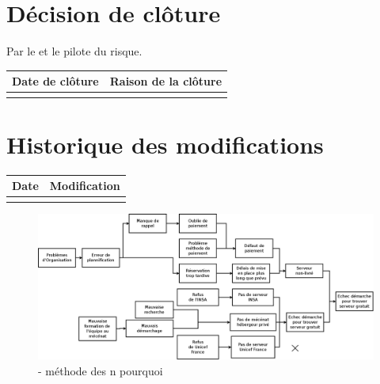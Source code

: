 %
%
%
%

\section*{Décision de clôture}
Par le \CP{} et le pilote du risque.
\begin{table}[H]
\centering
	\begin{tabularx}{16.8cm}{|X|X|}
	\hline
	\rowcolor{gray!40} Date de clôture & Raison de la clôture \\
	\hline
	  & \\
	\hline
	\end{tabularx}
\end{table}

\section*{Historique des modifications}
\begin{table}[H]
\centering
	\begin{tabularx}{16.8cm}{|X|X|}
	\hline
	Date & Modification \\
	\hline
	  & \\
	\hline
	\end{tabularx}
\end{table}
\newpage

\begin{figure}
	\centering
	\includegraphics[scale=0.25]{images/AnalyseRisque_nPourquoi_FDO009}
	\caption{\label{risque perte de document} - méthode des n pourquoi}
\end{figure}
